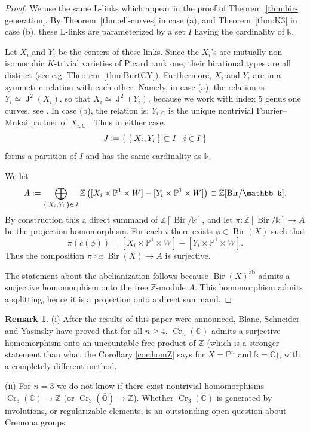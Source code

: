 \documentclass[a4paper,12pt]{amsart}
\def\C{\mathbb C}
\def\k{\mathbb k}
\def\P{\mathbb P}
\def\Q{\mathbb Q}
\def\Z{\mathbb Z}
\def\Bir{{\operatorname{Bir}}}
\def\Cr{{\operatorname{Cr}}}
\def\Jac{{\operatorname{J}}}
\def\ol{\overline}
\def\ab{{\mathrm{ab}}}
\theoremstyle{plain}
\numberwithin{equation}{section}
\theoremstyle{definition}
\newtheorem{remark}[dummy]{Remark}
\newcommand{\cnec}{\mathrel{:=}}
\renewcommand{\(}{\left(}
\renewcommand{\)}{\right)}
\begin{document}
\begin{proof}
We use the same
L-links which appear in the proof of
Theorem~\ref{thm:bir-generation}.
By Theorem~\ref{thm:ell-curves}
in case (a), and Theorem~\ref{thm:K3}
in case (b),
these L-links are
parameterized by a set $I$ having the cardinality of $\k$.
 
Let $X_i$ and $Y_i$ be the centers of these links.
Since the $X_i$'s are mutually non-isomorphic $K$-trivial varieties of Picard rank one, their birational types are all distinct (see e.g.
Theorem~\ref{thm:BurtCY}).
Furthermore, $X_i$ and $Y_i$
are in a symmetric relation with each other.
Namely, in case (a), the relation
is $Y_i \simeq \Jac^2(X_i)$,
so that $X_i \simeq \Jac^2(Y_i)$,
because we work with index $5$ genus one curves, see \cite[2.2]{ShinderZhang}.
In case (b), the relation is:
$Y_{i, \C}$ is the 
unique nontrivial
Fourier--Mukai partner of $X_{i,\C}$ \cite[3.1]{HassettLai}.
Thus in either case,
$$J \cnec \Set{ \Set{X_i,Y_i} \subset I | i \in I}$$
forms a partition of $I$
and has the same cardinality as $\k$.


We let
$$A \cnec \bigoplus_{\Set{X_i,Y_i} \in J}\Z\left([X_i \times \P^1 \times W] - [Y_i \times \P^1 \times W]\right) \subset
\Z[\Bir/\k].$$
By construction this a direct summand 
of $\Z[\Bir/\k]$, and let $\pi: \Z[\Bir/\k] \to A$ be the  projection homomorphism.
For each $i$ there exists
$\phi \in \Bir(X)$ such that $$\pi(c(\phi)) = 
[X_i \times \P^1 \times W] - [Y_i \times \P^1 \times W].$$
Thus the composition
$\pi \circ c: \Bir(X) \to A$ is surjective.

The statement about the abelianization follows
because $\Bir(X)^{\ab}$ admits a surjective homomorphism onto the free $\Z$-module $A$.
This homomorphism admits a splitting, hence it is 
a projection onto a direct summand.
\end{proof}


\begin{remark}
(i) After the results of this paper were announced, Blanc, Schneider and Yasinsky have proved that for all $n \ge 4$, $\Cr_n(\C)$ 
admits a surjective homomorphism onto an uncountable free product of $\Z$
\cite[Theorem B]{BSY} (which is
a stronger statement
than what
the Corollary \ref{cor:homZ} says
for $X = \P^n$ and $\k = \C$), with a completely different method.

(ii) For $n = 3$ we do not know
if there exist nontrivial homomorphisms $\Cr_3(\C) \to \Z$
(or $\Cr_3(\ol{\Q}) \to \Z$).
Whether $\Cr_3(\C)$ is generated by involutions, or regularizable elements, is an 
outstanding open
question about Cremona groups.
\end{remark}
\end{document}
